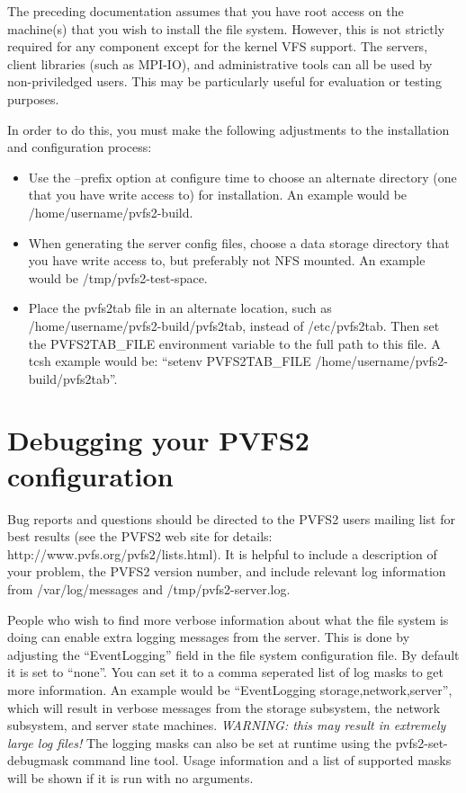 \documentclass[11pt, letterpaper]{article}
\begin{document}
The preceding documentation assumes that you have root access on the
machine(s) that you wish to install the file system.  However, this is
not strictly required for any component except for the kernel VFS
support.  The servers, client libraries (such as MPI-IO), and
administrative tools can all be used by non-priviledged users.  This
may be particularly useful for evaluation or testing purposes.

In order to do this, you must make the following adjustments to the
installation and configuration process:
\begin{itemize}
\item Use the --prefix option at configure time to choose an alternate
directory (one that you have write access to) for installation.  An example
would be /home/username/pvfs2-build.
\item When generating the server config files, choose a data storage
directory that you have write access to, but preferably not NFS mounted.  An
example would be /tmp/pvfs2-test-space.
\item Place the pvfs2tab file in an alternate location, such as
/home/username/pvfs2-build/pvfs2tab, instead of /etc/pvfs2tab.
Then set the PVFS2TAB\_FILE environment variable to the full path
to this file.  A tcsh example would be: ``setenv PVFS2TAB\_FILE
/home/username/pvfs2-build/pvfs2tab''.
\end{itemize}


\section{Debugging your PVFS2 configuration}

Bug reports and questions should be directed to the PVFS2 users
mailing list for best results (see the PVFS2 web site for details:
http://www.pvfs.org/pvfs2/lists.html).  It is helpful to include a
description of your problem, the PVFS2 version number, and include
relevant log information from /var/log/messages and
/tmp/pvfs2-server.log.

People who wish to find more verbose information about what the file
system is doing can enable extra logging messages from the server.
This is done by adjusting the ``EventLogging'' field in the file
system configuration file.  By default it is set to ``none''.  You can
set it to a comma seperated list of log masks to get more information.
An example would be ``EventLogging storage,network,server'', which
will result in verbose messages from the storage subsystem, the
network subsystem, and server state machines.  \emph{WARNING: this may
result in extremely large log files!}  The logging masks can also be
set at runtime using the pvfs2-set-debugmask command line tool.  Usage
information and a list of supported masks will be shown if it is run
with no arguments.
\end{document}
